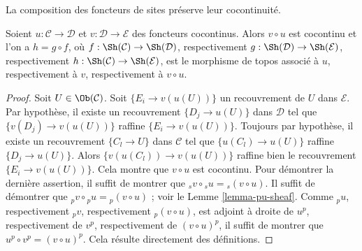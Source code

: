 \begin{lemma}
\label{lemma-composition-cocontinuous}
\begin{slogan}
La composition des foncteurs de sites préserve leur cocontinuité.
\end{slogan}
Soient $u : \mathcal{C} \to \mathcal{D}$ et
$v : \mathcal{D} \to \mathcal{E}$ des foncteurs cocontinus. Alors
$v \circ u$ est cocontinu et l’on a $h = g \circ f$, où
$f : \Sh(\mathcal{C}) \to \Sh(\mathcal{D})$, respectivement
$g : \Sh(\mathcal{D}) \to \Sh(\mathcal{E})$, respectivement
$h : \Sh(\mathcal{C}) \to \Sh(\mathcal{E})$, est le morphisme de topos
associé à $u$, respectivement à $v$, respectivement à $v \circ u$.
\end{lemma}

\begin{proof}
Soit $U \in \Ob(\mathcal{C})$.
Soit $\{E_i \to v(u(U))\}$ un recouvrement de $U$ dans $\mathcal{E}$.
Par hypothèse, il existe un recouvrement $\{D_j \to u(U)\}$ dans
$\mathcal{D}$ tel que $\{v(D_j) \to v(u(U))\}$ raffine
$\{E_i \to v(u(U))\}$. Toujours par hypothèse, il existe un recouvrement
$\{C_l \to U\}$ dans $\mathcal{C}$ tel que
$\{u(C_l) \to u(U)\}$ raffine $\{D_j \to u(U)\}$. Alors
$\{v(u(C_l)) \to v(u(U))\}$ raffine bien le recouvrement
$\{E_i \to v(u(U))\}$. Cela montre que $v \circ u$ est cocontinu.
Pour démontrer la dernière assertion, il suffit de montrer que
${}_sv \circ {}_su = {}_s(v \circ u)$. Il suffit de démontrer que
${}_pv \circ {}_pu = {}_p(v \circ u)$ ; voir le
Lemme \ref{lemma-pu-sheaf}. Comme ${}_pu$, respectivement ${}_pv$,
respectivement ${}_p(v \circ u)$, est adjoint à droite de $u^p$,
respectivement de $v^p$, respectivement de $(v \circ u)^p$, il suffit de
montrer que $u^p \circ v^p = (v \circ u)^p$. Cela résulte directement des
définitions.
\end{proof}


